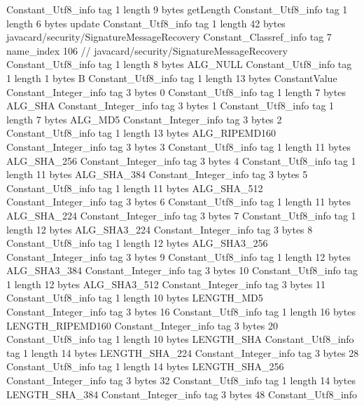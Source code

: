 {{		Constant_Utf8_info {
			tag	1
			length	9
			bytes	getLength
		}
		Constant_Utf8_info {
			tag	1
			length	6
			bytes	update
		}
		Constant_Utf8_info {
			tag	1
			length	42
			bytes	javacard/security/SignatureMessageRecovery
		}
		Constant_Classref_info {
			tag	7
			name_index	106		// javacard/security/SignatureMessageRecovery
		}
		Constant_Utf8_info {
			tag	1
			length	8
			bytes	ALG_NULL
		}
		Constant_Utf8_info {
			tag	1
			length	1
			bytes	B
		}
		Constant_Utf8_info {
			tag	1
			length	13
			bytes	ConstantValue
		}
		Constant_Integer_info {
			tag	3
			bytes	0
		}
		Constant_Utf8_info {
			tag	1
			length	7
			bytes	ALG_SHA
		}
		Constant_Integer_info {
			tag	3
			bytes	1
		}
		Constant_Utf8_info {
			tag	1
			length	7
			bytes	ALG_MD5
		}
		Constant_Integer_info {
			tag	3
			bytes	2
		}
		Constant_Utf8_info {
			tag	1
			length	13
			bytes	ALG_RIPEMD160
		}
		Constant_Integer_info {
			tag	3
			bytes	3
		}
		Constant_Utf8_info {
			tag	1
			length	11
			bytes	ALG_SHA_256
		}
		Constant_Integer_info {
			tag	3
			bytes	4
		}
		Constant_Utf8_info {
			tag	1
			length	11
			bytes	ALG_SHA_384
		}
		Constant_Integer_info {
			tag	3
			bytes	5
		}
		Constant_Utf8_info {
			tag	1
			length	11
			bytes	ALG_SHA_512
		}
		Constant_Integer_info {
			tag	3
			bytes	6
		}
		Constant_Utf8_info {
			tag	1
			length	11
			bytes	ALG_SHA_224
		}
		Constant_Integer_info {
			tag	3
			bytes	7
		}
		Constant_Utf8_info {
			tag	1
			length	12
			bytes	ALG_SHA3_224
		}
		Constant_Integer_info {
			tag	3
			bytes	8
		}
		Constant_Utf8_info {
			tag	1
			length	12
			bytes	ALG_SHA3_256
		}
		Constant_Integer_info {
			tag	3
			bytes	9
		}
		Constant_Utf8_info {
			tag	1
			length	12
			bytes	ALG_SHA3_384
		}
		Constant_Integer_info {
			tag	3
			bytes	10
		}
		Constant_Utf8_info {
			tag	1
			length	12
			bytes	ALG_SHA3_512
		}
		Constant_Integer_info {
			tag	3
			bytes	11
		}
		Constant_Utf8_info {
			tag	1
			length	10
			bytes	LENGTH_MD5
		}
		Constant_Integer_info {
			tag	3
			bytes	16
		}
		Constant_Utf8_info {
			tag	1
			length	16
			bytes	LENGTH_RIPEMD160
		}
		Constant_Integer_info {
			tag	3
			bytes	20
		}
		Constant_Utf8_info {
			tag	1
			length	10
			bytes	LENGTH_SHA
		}
		Constant_Utf8_info {
			tag	1
			length	14
			bytes	LENGTH_SHA_224
		}
		Constant_Integer_info {
			tag	3
			bytes	28
		}
		Constant_Utf8_info {
			tag	1
			length	14
			bytes	LENGTH_SHA_256
		}
		Constant_Integer_info {
			tag	3
			bytes	32
		}
		Constant_Utf8_info {
			tag	1
			length	14
			bytes	LENGTH_SHA_384
		}
		Constant_Integer_info {
			tag	3
			bytes	48
		}
		Constant_Utf8_info {
}}}
